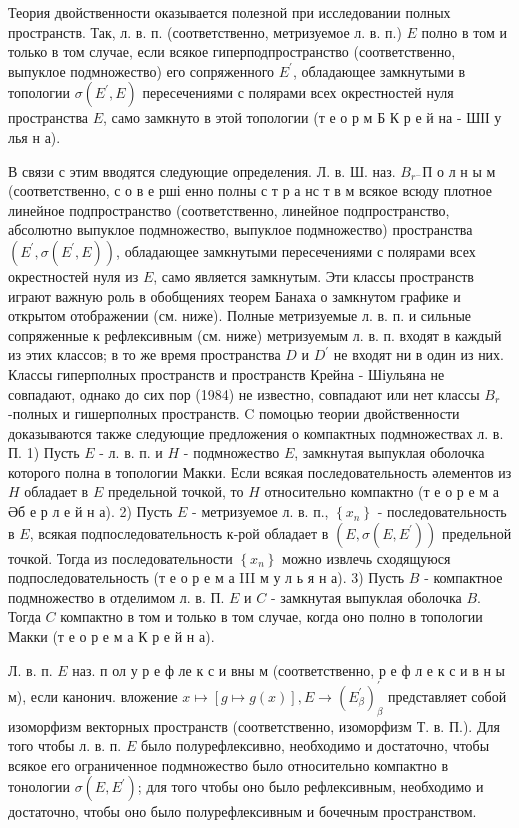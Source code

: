\documentclass[10pt]{article}
\begin{document}
Теория двойственности оказывается полезной при исследовании полных пространств. Так, л. в. п. (соответственно, метризуемое л. в. п.) $E$ полно в том и только в том случае, если всякое гиперподпространство (соответственно, выпуклое подмножество) его сопряженного $E^{\prime}$, обладающее замкнутыми в топологии $\sigma\left(E^{\prime}, E\right)$ пересечениями с полярами всех окрестностей нуля пространства $E$, само замкнуто в этой топологии (т е о р м Б К р е й на - ШІІ у лья н а).



В связи с этим вводятся следующие определения. Л. в. Ш. наз. $B_{r^{-}}$П о л н ы м (соответственно, с о в е рші енно полны с т р а нс т в м всякое всюду плотное линейное подпространство (соответственно, линейное подпространство, абсолютно выпуклое подмножество, выпуклое подмножество) пространства $\left(E^{\prime}, \sigma\left(E^{\prime}, E\right)\right)$, обладающее замкнутыми пересечениями с полярами всех окрестностей нуля из $E$, само является замкнутым. Эти классы пространств играют важную роль в обобщениях теорем Банаха о замкнутом графике и открытом отображении (см. ниже). Полные метризуемые л. в. п. и сильные сопряженные к рефлексивным (см. ниже) метризуемым л. в. п. входят в каждый из этих классов; в то же время пространства $D$ и $D^{\prime}$ не входят ни в один из них. Классы гиперполных пространств и пространств Крейна - Шіульяна не совпадают, однако до сих пор (1984) не известно, совпадают или нет классы $B_{r}$-полных и гишерполных пространств. C помоцью теории двойственности доказываются также следующие предложения о компактных подмножествах л. в. П. 1) Пусть $E$ - л. в. п. и $H$ - подмножество $E$, замкнутая выпуклая оболочка которого полна в топологии Макки. Если всякая последовательность әлементов из $H$ обладает в $E$ предельной точкой, то $H$ относительно компактно (т е о р е м а Әб е р л е й н а). 2) Пусть $E$ - метризуемое л. в. п., $\left\{x_{n}\right\}$ - последовательность в $E$, всякая подпоследовательность к-рой обладает в $\left(E, \sigma\left(E, E^{\prime}\right)\right)$ предельной точкой. Тогда из последовательности $\left\{x_{n}\right\}$ можно извлечь сходящуюся подпоследовательность (т е о р е м а III м у л ь я н а). 3) Пусть $B$ - компактное подмножество в отделимом л. в. П. $E$ и $C$ - замкнутая выпуклая оболочка $B$. Тогда $C$ компактно в том и только в том случае, когда оно полно в топологии Макки (т е о р е м а $К$ р е й н а).



Л. в. п. $E$ наз. п ол у р е ф ле к с и вны м (соответственно, р е ф л е к с и в н ы м), если канонич. вложение $x \mapsto[g \mapsto g(x)], E \rightarrow\left(E_{\beta}^{\prime}\right)_{\beta}^{\prime}$ представляет собой изоморфизм векторных пространств (соответственно, изоморфизм Т. в. П.). Для того чтобы л. в. п. $E$ было полурефлексивно, необходимо и достаточно, чтобы всякое его ограниченное подмножество было относительно компактно в тонологии $\sigma\left(E, E^{\prime}\right)$; для того чтобы оно было рефлексивным, необходимо и достаточно, чтобы оно было полурефлексивным и бочечным пространством.
\end{document}
